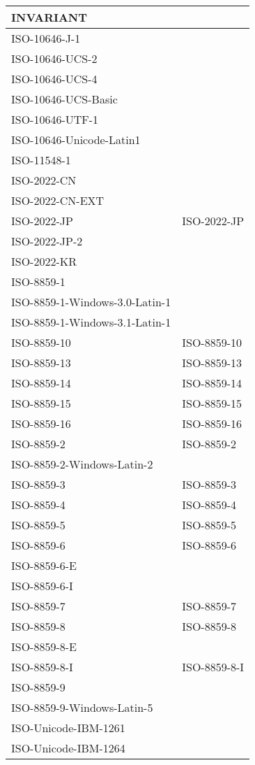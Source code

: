 \documentclass{wg21}
\begin{document}
\begin{longtable}{| p{} | p{} |}
INVARIANT & \\ \hline
ISO-10646-J-1 & \\ \hline
ISO-10646-UCS-2 & \\ \hline
ISO-10646-UCS-4 & \\ \hline
ISO-10646-UCS-Basic & \\ \hline
ISO-10646-UTF-1 & \\ \hline
ISO-10646-Unicode-Latin1 & \\ \hline
ISO-11548-1 & \\ \hline
ISO-2022-CN & \\ \hline
ISO-2022-CN-EXT & \\ \hline
ISO-2022-JP & ISO-2022-JP\\ \hline
ISO-2022-JP-2 & \\ \hline
ISO-2022-KR & \\ \hline
ISO-8859-1 & \\ \hline
ISO-8859-1-Windows-3.0-Latin-1 & \\ \hline
ISO-8859-1-Windows-3.1-Latin-1 & \\ \hline
ISO-8859-10 & ISO-8859-10\\ \hline
ISO-8859-13 & ISO-8859-13\\ \hline
ISO-8859-14 & ISO-8859-14\\ \hline
ISO-8859-15 & ISO-8859-15\\ \hline
ISO-8859-16 & ISO-8859-16\\ \hline
ISO-8859-2 & ISO-8859-2\\ \hline
ISO-8859-2-Windows-Latin-2 & \\ \hline
ISO-8859-3 & ISO-8859-3\\ \hline
ISO-8859-4 & ISO-8859-4\\ \hline
ISO-8859-5 & ISO-8859-5\\ \hline
ISO-8859-6 & ISO-8859-6\\ \hline
ISO-8859-6-E & \\ \hline
ISO-8859-6-I & \\ \hline
ISO-8859-7 & ISO-8859-7\\ \hline
ISO-8859-8 & ISO-8859-8\\ \hline
ISO-8859-8-E & \\ \hline
ISO-8859-8-I & ISO-8859-8-I\\ \hline
ISO-8859-9 & \\ \hline
ISO-8859-9-Windows-Latin-5 & \\ \hline
ISO-Unicode-IBM-1261 & \\ \hline
ISO-Unicode-IBM-1264 & \\ \hline

\end{longtable}
\end{document}

